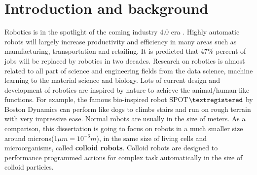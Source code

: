 \chapter{Introduction and background}
Robotics is in the spotlight of the coming industry 4.0 era \cite{lasi2014industry}. Highly automatic robots will largely increase productivity and efficiency in many areas such as manufacturing, transportation and retailing. 
It is predicted that 47$\%$ percent of jobs will be replaced by robotics in two decades. \cite{frey2013future}
Research on robotics is almost related to all part of science and engineering fields from the data science, machine learning to the material science and biology. Lots of current design and development of robotics are inspired by nature to achieve the animal/human-like functions. For example,  the famous  bio-inspired robot SPOT$\textregistered$  by Boston Dynamics \cite{yang2019ten} can perform like dogs  to climbs stairs and run on rough terrain with very impressive ease. Normal robots are usually in the size of meters. As a comparison, this dissertation is going to focus on robots in a much smaller size around microns(1$\mu m=10^{-6} m$), in the same size of living cells and microorganisms, called \textbf{colloid robots}.
Colloid robots are designed to performance  programmed actions for complex task automatically in the size of colloid particles.


